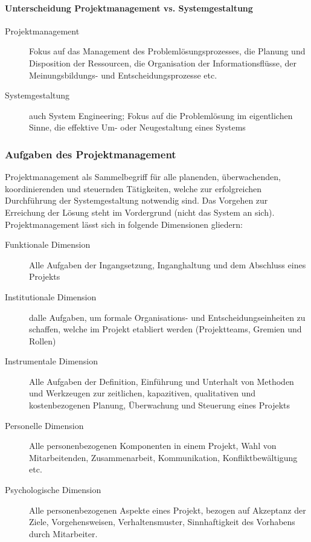 \documentclass[a4paper]{article}
\begin{document}
				\paragraph{Unterscheidung Projektmanagement vs. Systemgestaltung}
								
				\begin{description}
					\item[Projektmanagement] Fokus auf das Management des Problemlösungsprozesses, die Planung und Disposition der Ressourcen, die Organisation der Informationsflüsse, der Meinungsbildungs- und Entscheidungsprozesse etc.
					\item[Systemgestaltung] auch System Engineering; Fokus auf die Problemlösung im eigentlichen Sinne, die effektive Um- oder Neugestaltung eines Systems
				\end{description}
			
			\subsubsection{Aufgaben des Projektmanagement}
			
			Projektmanagement als Sammelbegriff für alle planenden, überwachenden, koordinierenden und steuernden Tätigkeiten, welche zur erfolgreichen Durchführung der Systemgestaltung notwendig sind.
			Das Vorgehen zur Erreichung der Lösung steht im Vordergrund (nicht das System an sich).
			Projektmanagement lässt sich in folgende Dimensionen gliedern:
			\vspace{1em}
			\begin{description}
				\item[Funktionale Dimension] Alle Aufgaben der Ingangsetzung, Inganghaltung und dem Abschluss eines Projekts
				\item[Institutionale Dimension] dalle Aufgaben, um formale Organisations- und Entscheidungseinheiten zu schaffen, welche im Projekt etabliert werden (Projektteams, Gremien und Rollen)
				\item[Instrumentale Dimension] Alle Aufgaben der Definition, Einführung und Unterhalt von Methoden und Werkzeugen zur zeitlichen, kapazitiven, qualitativen und kostenbezogenen Planung, Überwachung und Steuerung eines Projekts
				\item[Personelle Dimension] Alle personenbezogenen Komponenten in einem Projekt, Wahl von Mitarbeitenden, Zusammenarbeit, Kommunikation, Konfliktbewältigung etc.
				\item[Psychologische Dimension] Alle personenbezogenen Aspekte eines Projekt, bezogen auf Akzeptanz der Ziele, Vorgehensweisen, Verhaltensmuster, Sinnhaftigkeit des Vorhabens durch Mitarbeiter.
			\end{description}
		
\end{document}
